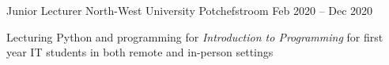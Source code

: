 \begin{cventries}
  
  \cventry
  {Junior Lecturer}
  {North-West University}
  {Potchefstroom}
  {Feb 2020 -- Dec 2020}
  {  
    \begin{cvitems}  
      \item Lecturing Python and \cpp programming for \emph{Introduction to Programming} for first year IT students in both remote and in-person settings
    \end{cvitems}
  }
  
\end{cventries}
